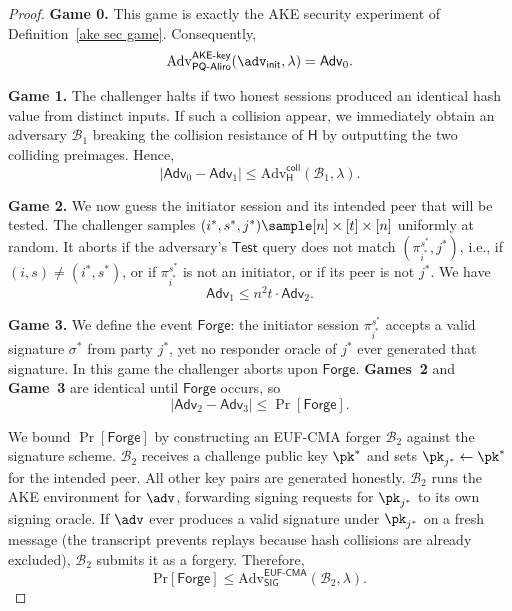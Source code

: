 \documentclass[runningheads]{llncs}
\begin{document}
\begin{proof}
    \smallskip\noindent\textbf{Game 0.}
    This game is exactly the AKE security experiment of Definition~\ref{ake sec game}. Consequently,
        \begin{equation}
            \mathrm{Adv}_{\mathsf{PQ}\text{-}\mathsf{Aliro}}^{\mathsf{AKE}\text{-}\mathsf{key}}(\adv_{\sf init},\lambda) = \mathsf{Adv}_{0}.
        \end{equation}
    
    \noindent\textbf{Game 1.}
    The challenger halts if two honest sessions produced an identical hash value from distinct inputs. If such a collision appear, we immediately obtain an adversary $\mathcal{B}_1$ breaking the collision resistance of $\mathsf{H}$ by outputting the two colliding preimages. Hence,
        \begin{equation}
            |\mathsf{Adv}_{0} - \mathsf{Adv}_{1}| \leq \mathrm{Adv}_{\mathsf{H}}^{\mathsf{coll}}(\mathcal{B}_{1}, \lambda).
        \end{equation}

    \smallskip\noindent\textbf{Game 2.}
    We now guess the initiator session and its intended peer that will be tested. The challenger samples $(i^\ast, s^\ast, j^\ast) \sample [n] \times [t] \times [n]$ uniformly at random. It aborts if the adversary’s $\textsf{Test}$ query does not match $(\pi_{i^\ast}^{s^\ast}, j^\ast)$, i.e., if $(i,s) \neq (i^\ast, s^\ast)$, or if $\pi_{i^\ast}^{s^\ast}$ is not an initiator, or if its peer is not $j^\ast$. We have
        \begin{equation}
            \mathsf{Adv}_{1} \leq n^{2} t \cdot \mathsf{Adv}_{2}.
        \end{equation}
    
    \smallskip\noindent\textbf{Game 3.}
    We define the event $\textsf{Forge}$: the initiator session $\pi_{i^\ast}^{s^\ast}$ accepts a valid signature $\sigma^\ast$ from party $j^\ast$, yet no responder oracle of $j^\ast$ ever generated that signature.
    In this game the challenger aborts upon $\textsf{Forge}$. \textbf{Games~2} and \textbf{Game~3} are identical until $\textsf{Forge}$ occurs, so
        \begin{equation}
        \label{g3-1}
            |\mathsf{Adv}_{2} - \mathsf{Adv}_{3}| \leq \Pr[\textsf{Forge}].
        \end{equation}

We bound $\Pr[\textsf{Forge}]$ by constructing an EUF-CMA forger $\mathcal{B}_{2}$ against the signature scheme. $\mathcal{B}_{2}$ receives a challenge public key $\pk^\ast$ and sets $\pk_{j^\ast} \gets \pk^\ast$ for the intended peer. All other key pairs are generated honestly. $\mathcal{B}_{2}$ runs the AKE environment for $\adv$, forwarding signing requests for $\pk_{j^\ast}$ to its own signing oracle. If $\adv$ ever produces a valid signature under $\pk_{j^\ast}$ on a fresh message (the transcript prevents replays because hash collisions are already excluded), $\mathcal{B}_{2}$ submits it as a forgery. Therefore,
        \begin{equation}
        \label{g3-2}
        \text{Pr}[\textsf{Forge}] \leq \mathrm{Adv}_{\mathsf{SIG}}^{\mathsf{EUF}\text{-}\mathsf{CMA}}(\mathcal{B}_{2}, \lambda).
        \end{equation}


\end{proof}
\end{document}
